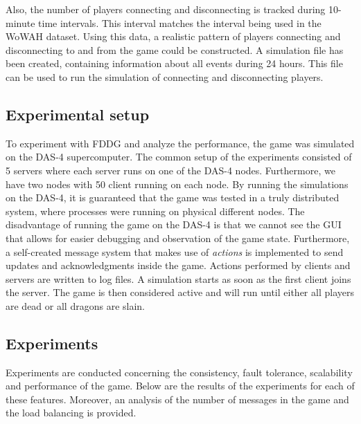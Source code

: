 Also, the number of players connecting and disconnecting is tracked during 10-minute time intervals.
This interval matches the interval being used in the WoWAH dataset.
Using this data, a realistic pattern of players connecting and disconnecting to and from the game could be constructed.
A simulation file has been created, containing information about all events during 24 hours. This file can be used to run the simulation of connecting and disconnecting players.

\subsection{Experimental setup}
\label{subsec:experimental_setup}

To experiment with FDDG and analyze the performance, the game was simulated on the DAS-4 supercomputer.
The common setup of the experiments consisted of 5 servers where each server runs on one of the DAS-4 nodes. Furthermore, we have two nodes with 50 client running on each node.
By running the simulations on the DAS-4, it is guaranteed that the game was tested in a truly distributed system, where processes were running on physical different nodes.
The disadvantage of running the game on the DAS-4 is that we cannot see the GUI that allows for easier debugging and observation of the game state.
Furthermore, a self-created message system that makes use of \emph{actions} is implemented to send updates and acknowledgments inside the game. Actions performed by clients and servers are written to log files.
A simulation starts as soon as the first client joins the server. The game is then considered active and will run until either all players are dead or all dragons are slain.


\subsection{Experiments}
\label{subsec:experiments}
	Experiments are conducted concerning the consistency, fault tolerance, scalability and performance of the game. Below are the results of the experiments for each of these features. Moreover, an analysis of the number of messages in the game and the load balancing is provided.

